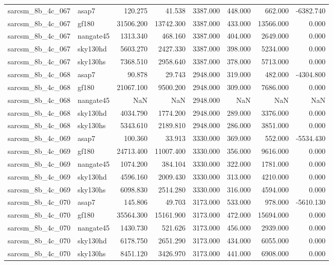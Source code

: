 \begin{tabular}{llrrrrrr}
sarcsm\_8b\_4c\_067 & asap7 & 120.275 & 41.538 & 3387.000 & 448.000 & 662.000 & -6382.740 \\
sarcsm\_8b\_4c\_067 & gf180 & 31506.200 & 13742.300 & 3387.000 & 433.000 & 13566.000 & 0.000 \\
sarcsm\_8b\_4c\_067 & nangate45 & 1313.340 & 468.160 & 3387.000 & 404.000 & 2649.000 & 0.000 \\
sarcsm\_8b\_4c\_067 & sky130hd & 5603.270 & 2427.330 & 3387.000 & 398.000 & 5234.000 & 0.000 \\
sarcsm\_8b\_4c\_067 & sky130hs & 7368.510 & 2958.640 & 3387.000 & 378.000 & 5713.000 & 0.000 \\
sarcsm\_8b\_4c\_068 & asap7 & 90.878 & 29.743 & 2948.000 & 319.000 & 482.000 & -4304.800 \\
sarcsm\_8b\_4c\_068 & gf180 & 21067.100 & 9500.200 & 2948.000 & 309.000 & 7686.000 & 0.000 \\
sarcsm\_8b\_4c\_068 & nangate45 & NaN & NaN & 2948.000 & NaN & NaN & NaN \\
sarcsm\_8b\_4c\_068 & sky130hd & 4034.790 & 1774.200 & 2948.000 & 289.000 & 3376.000 & 0.000 \\
sarcsm\_8b\_4c\_068 & sky130hs & 5343.610 & 2189.810 & 2948.000 & 286.000 & 3851.000 & 0.000 \\
sarcsm\_8b\_4c\_069 & asap7 & 100.360 & 33.913 & 3330.000 & 369.000 & 552.000 & -5534.430 \\
sarcsm\_8b\_4c\_069 & gf180 & 24713.400 & 11007.400 & 3330.000 & 356.000 & 9616.000 & 0.000 \\
sarcsm\_8b\_4c\_069 & nangate45 & 1074.200 & 384.104 & 3330.000 & 322.000 & 1781.000 & 0.000 \\
sarcsm\_8b\_4c\_069 & sky130hd & 4596.160 & 2009.430 & 3330.000 & 313.000 & 4210.000 & 0.000 \\
sarcsm\_8b\_4c\_069 & sky130hs & 6098.830 & 2514.280 & 3330.000 & 316.000 & 4594.000 & 0.000 \\
sarcsm\_8b\_4c\_070 & asap7 & 145.806 & 49.703 & 3173.000 & 533.000 & 978.000 & -5610.130 \\
sarcsm\_8b\_4c\_070 & gf180 & 35564.300 & 15161.900 & 3173.000 & 472.000 & 15694.000 & 0.000 \\
sarcsm\_8b\_4c\_070 & nangate45 & 1430.730 & 521.626 & 3173.000 & 456.000 & 2939.000 & 0.000 \\
sarcsm\_8b\_4c\_070 & sky130hd & 6178.750 & 2651.290 & 3173.000 & 434.000 & 6055.000 & 0.000 \\
sarcsm\_8b\_4c\_070 & sky130hs & 8451.120 & 3426.970 & 3173.000 & 441.000 & 6908.000 & 0.000 \\

\end{tabular}
